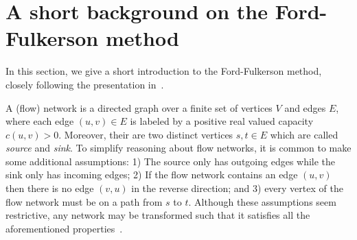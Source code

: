 \documentclass{llncs}
\begin{document}
\section{A short background on the Ford-Fulkerson method}\label{sec:background}
%       
%   
% 
%         
%   
%   
%   
%   
%   

In this section, we give a short introduction to the Ford-Fulkerson method, closely following the presentation in~\cite{CLRS09}.

A (flow) network is a directed graph over a finite set of vertices $V$ and edges $E$, where each edge $(u,v)\in E$ is labeled by a positive real valued capacity $c(u,v)>0$.
Moreover, their are two distinct vertices $s,t\in E$ which are called \emph{source} and \emph{sink}. To simplify reasoning about flow networks, it is common to make some additional assumptions: 1) The source only has outgoing edges while the sink only has incoming edges; 2) If the flow network contains an edge $(u, v)$ then there is no edge $(v, u)$ in the reverse direction; and 3) every vertex of the flow network must be on a path from $s$ to $t$. Although these assumptions seem restrictive, any network may be transformed such that it satisfies all the aforementioned properties~\cite{CLRS09}.
\end{document}
